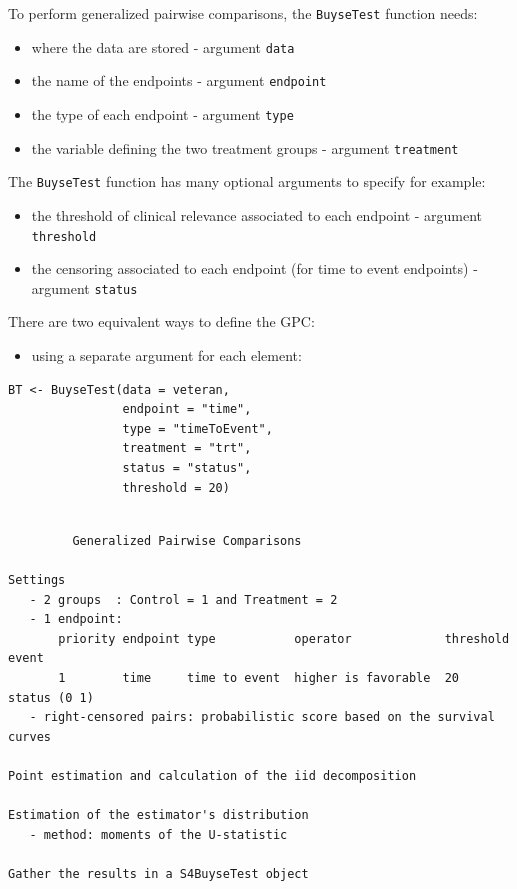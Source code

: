 \documentclass[12pt]{article}
\begin{document}
To perform generalized pairwise comparisons, the \texttt{BuyseTest} function needs:
\begin{itemize}
\item where the data are stored \hfill - argument \texttt{data}
\item the name of the endpoints \hfill - argument \texttt{endpoint}
\item the type of each endpoint \hfill - argument \texttt{type}
\item the variable defining the two treatment groups \hfill - argument
\texttt{treatment}
\end{itemize}
The \texttt{BuyseTest} function has many optional arguments to specify for example:
\begin{itemize}
\item the threshold of clinical relevance associated to each endpoint \hfill - argument \texttt{threshold}
\item the censoring associated to each endpoint (for time to event endpoints) \hfill - argument \texttt{status}
\end{itemize}

\bigskip

There are two equivalent ways to define the GPC: 
\begin{itemize}
\item using a separate argument for each element:
\end{itemize}

\lstset{language=r,label= ,caption= ,captionpos=b,numbers=none}
\begin{lstlisting}
BT <- BuyseTest(data = veteran, 
                endpoint = "time", 
                type = "timeToEvent", 
                treatment = "trt", 
                status = "status", 
                threshold = 20)
\end{lstlisting}

\begin{verbatim}

         Generalized Pairwise Comparisons

Settings 
   - 2 groups  : Control = 1 and Treatment = 2
   - 1 endpoint: 
       priority endpoint type           operator             threshold event       
       1        time     time to event  higher is favorable  20        status (0 1)
   - right-censored pairs: probabilistic score based on the survival curves 

Point estimation and calculation of the iid decomposition

Estimation of the estimator's distribution 
   - method: moments of the U-statistic

Gather the results in a S4BuyseTest object
\end{verbatim}
\end{document}
